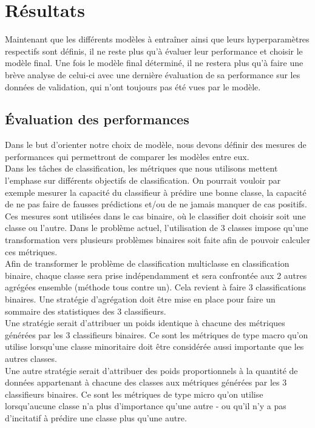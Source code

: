 \section{Résultats}
Maintenant que les différents modèles à entraîner ainsi que leurs hyperparamètres respectifs sont définis, il ne reste plus qu'à évaluer leur performance et choisir le modèle final. Une fois le modèle final déterminé, il ne restera plus qu'à faire une brève analyse de celui-ci avec une dernière évaluation de sa performance sur les données de validation, qui n'ont toujours pas été vues par le modèle.  


\subsection{Évaluation des performances}
Dans le but d'orienter notre choix de modèle, nous devons définir des mesures de performances qui permettront de comparer les modèles entre eux. \\

Dans les tâches de classification, les métriques que nous utilisons mettent l'emphase sur différents objectifs de classification. On pourrait vouloir par exemple mesurer la capacité du classifieur à prédire une bonne classe, la capacité de ne pas faire de fausses prédictions et/ou de ne jamais manquer de cas positifs. Ces mesures sont utilisées dans le cas binaire, où le classifier doit choisir soit une classe ou l'autre. Dans le  problème actuel, l'utilisation de 3 classes impose qu'une transformation vers plusieurs problèmes binaires soit faite afin de pouvoir calculer ces métriques. \\

Afin de transformer le problème de classification multiclasse en classification binaire, chaque classe sera prise indépendamment et sera confrontée aux 2 autres agrégées ensemble (méthode tous contre un). Cela revient à faire 3 classifications binaires. Une stratégie d'agrégation doit être mise en place pour faire un sommaire des statistiques des 3 classifieurs. \\ Une stratégie serait d'attribuer un poids identique à chacune des métriques générées par les 3 classifieurs binaires. Ce sont les métriques de type macro qu'on utilise lorsqu'une classe minoritaire doit être considérée aussi importante que les autres classes. \\ Une autre stratégie serait d'attribuer des poids proportionnels à la quantité de données appartenant à chacune des classes aux métriques générées par les 3 classifieurs binaires. Ce sont les métriques de type micro qu'on utilise lorsqu'aucune classe n'a plus d'importance qu'une autre - ou qu'il n'y a pas d'incitatif à prédire une classe plus qu'une autre. \\

